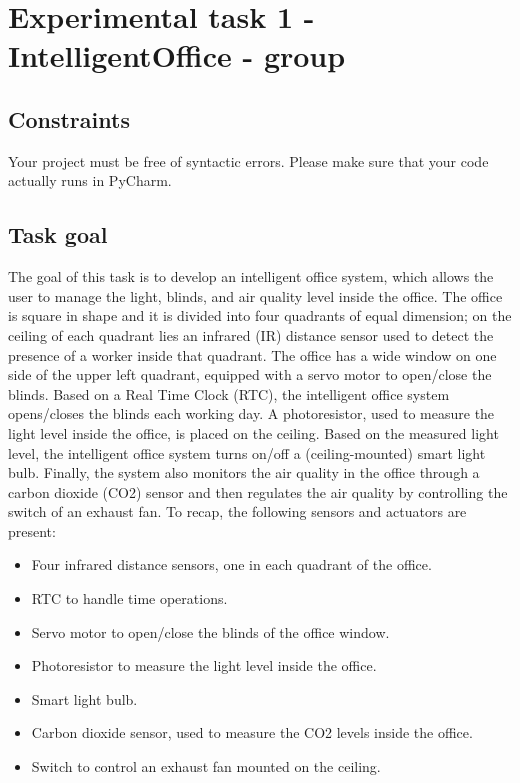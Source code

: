 \chapter{Experimental task 1 - IntelligentOffice - \tdd group}
\section{Constraints}
Your project must be free of syntactic errors. Please make sure that your code actually runs in PyCharm.

\section{Task goal}
The goal of this task is to develop an intelligent office system, which allows the user to manage the light, blinds, and air quality level inside the office.
The office is square in shape and it is divided into four quadrants of equal dimension; on the ceiling of each quadrant lies an infrared (IR) distance sensor used to detect the presence of a worker inside that quadrant. 
The office has a wide window on one side of the upper left quadrant, equipped with a servo motor to open/close the blinds. 
Based on a Real Time Clock (RTC), the intelligent office system opens/closes the blinds each working day. 
A photoresistor, used to measure the light level inside the office, is placed on the ceiling. Based on the measured light level, the intelligent office system turns on/off a (ceiling-mounted) smart light bulb. 
Finally, the system also monitors the air quality in the office through a carbon dioxide (CO2) sensor and then regulates the air quality by controlling the switch of an exhaust fan.
To recap, the following sensors and actuators are present:

\begin{itemize}
    \item Four infrared distance sensors, one in each quadrant of the office.
    \item RTC to handle time operations.
    \item Servo motor to open/close the blinds of the office window.
    \item Photoresistor to measure the light level inside the office.
    \item Smart light bulb.
    \item Carbon dioxide sensor, used to measure the CO2 levels inside the office.
    \item Switch to control an exhaust fan mounted on the ceiling.
\end{itemize}

